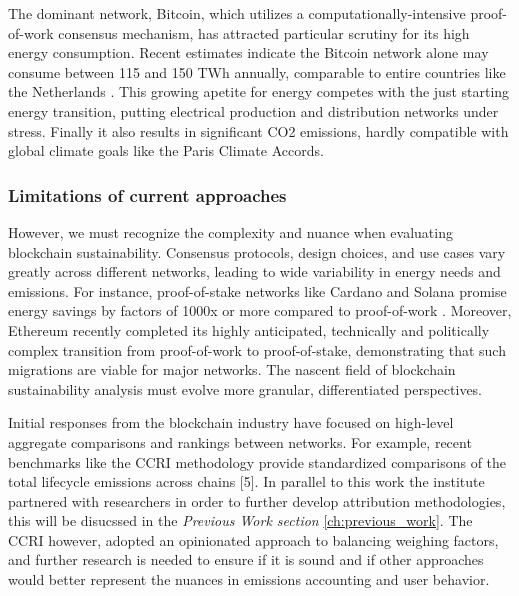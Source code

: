 \documentclass[11pt]{report}
\begin{document}
The dominant network, Bitcoin, which utilizes a computationally-intensive proof-of-work consensus mechanism, has attracted particular scrutiny for its high energy consumption. Recent estimates indicate the Bitcoin network alone may consume between 115 and 150 TWh annually, comparable to entire countries like the Netherlands \cite{devriesRevisitingBitcoinCarbon2022,neumuellerCambridgeBitcoinElectricity2021}. This growing apetite for energy competes with the just starting energy transition, putting electrical production and distribution networks under stress. Finally it also results in significant CO2 emissions, hardly compatible with global climate goals like the Paris Climate Accords.

\subsubsection*{Limitations of current approaches}
However, we must recognize the complexity and nuance when evaluating blockchain sustainability. Consensus protocols, design choices, and use cases vary greatly across different networks, leading to wide variability in energy needs and emissions. For instance, proof-of-stake networks like Cardano and Solana promise energy savings by factors of 1000x or more compared to proof-of-work \cite{kohliAnalysisEnergyConsumption2023}. Moreover, Ethereum recently completed its highly anticipated, technically and politically complex transition from proof-of-work to proof-of-stake, demonstrating that such migrations are viable for major networks. \cite{bloombergnewsEthereumMergeYour2022} The nascent field of blockchain sustainability analysis must evolve more granular, differentiated perspectives.

Initial responses from the blockchain industry have focused on high-level aggregate comparisons and rankings between networks. For example, recent benchmarks like the \ac{CCRI} methodology provide standardized comparisons of the total lifecycle emissions across chains [5]. In parallel to this work the institute partnered with researchers in order to further develop attribution methodologies, this will be disucssed in the \textit{Previous Work section} \ref{ch:previous_work}. The CCRI however, adopted an opinionated approach to balancing weighing factors, and further research is needed to ensure if it is sound and if other approaches would better represent the nuances in emissions accounting and user behavior.
\end{document}
